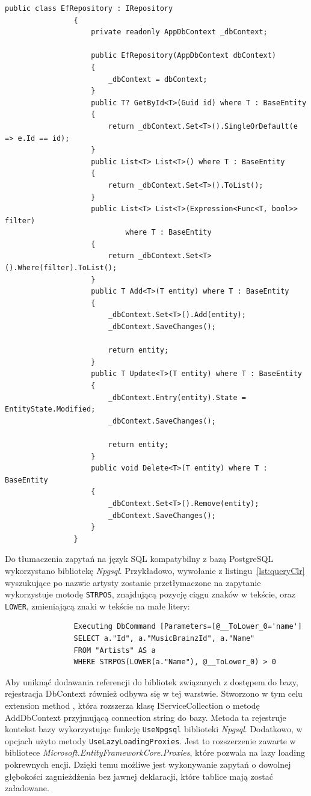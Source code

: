 			\begin{lstlisting}[label=lst:repository, caption=Implementacja repozytorium, float]
				public class EfRepository : IRepository
				{
					private readonly AppDbContext _dbContext;
			
					public EfRepository(AppDbContext dbContext)
					{
						_dbContext = dbContext;
					}
					public T? GetById<T>(Guid id) where T : BaseEntity
					{
						return _dbContext.Set<T>().SingleOrDefault(e => e.Id == id);
					}
					public List<T> List<T>() where T : BaseEntity
					{
						return _dbContext.Set<T>().ToList();
					}
					public List<T> List<T>(Expression<Func<T, bool>> filter)
							where T : BaseEntity
					{
						return _dbContext.Set<T>().Where(filter).ToList();
					}
					public T Add<T>(T entity) where T : BaseEntity
					{
						_dbContext.Set<T>().Add(entity);
						_dbContext.SaveChanges();
			
						return entity;
					}
					public T Update<T>(T entity) where T : BaseEntity
					{
						_dbContext.Entry(entity).State = EntityState.Modified;
						_dbContext.SaveChanges();
			
						return entity;
					}
					public void Delete<T>(T entity) where T : BaseEntity
					{
						_dbContext.Set<T>().Remove(entity);
						_dbContext.SaveChanges();
					}
				}
			\end{lstlisting}
			
			Do tłumaczenia zapytań na język SQL kompatybilny z bazą PostgreSQL wykorzystano bibliotekę \emph{Npgsql}.
			Przykładowo, wywołanie z listingu~\ref{lst:queryClr} wyszukujące po nazwie artysty zostanie przetłymaczone na zapytanie wykorzystuje motodę \verb|STRPOS|,
			znajdującą pozycję ciągu znaków w tekście, oraz \verb|LOWER|, zmieniającą znaki w tekście na małe litery:
			\begin{lstlisting}
				Executing DbCommand [Parameters=[@__ToLower_0='name']
				SELECT a."Id", a."MusicBrainzId", a."Name"
				FROM "Artists" AS a
				WHERE STRPOS(LOWER(a."Name"), @__ToLower_0) > 0
			\end{lstlisting}
			
			Aby uniknąć dodawania referencji do bibliotek związanych z dostępem do bazy, rejestracja DbContext również odbywa się w tej warstwie.
			Stworzono w tym celu extension method ,
			która rozszerza klasę IServiceCollection o metodę AddDbContext przyjmującą connection string do bazy.
			Metoda ta rejestruje kontekst bazy wykorzystując funkcję \verb|UseNpgsql| biblioteki \emph{Npgsql}.
			Dodatkowo, w opcjach użyto metody \verb|UseLazyLoadingProxies|.
			Jest to rozszerzenie zawarte w bibliotece \emph{Microsoft.EntityFrameworkCore.Proxies},
			które pozwala na lazy loading  pokrewnych encji.
			Dzięki temu możliwe jest wykonywanie zapytań o dowolnej głębokości zagnieżdżenia bez jawnej deklaracji, które tablice mają zostać załadowane.
			
